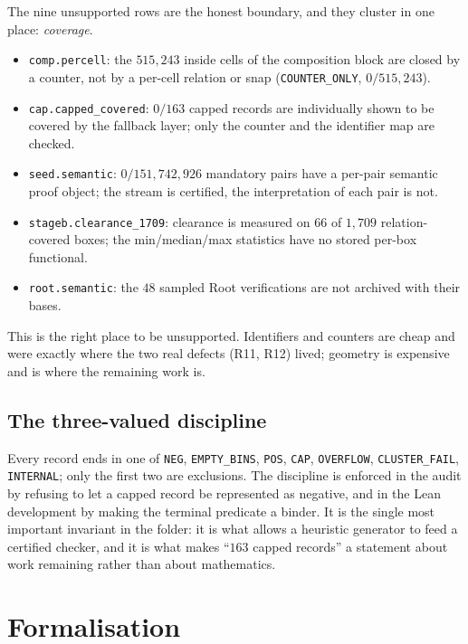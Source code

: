 \documentclass[10pt]{article}
\theoremstyle{definition}
\newcommand{\file}[1]{\texttt{\small #1}}
\begin{document}
The nine unsupported rows are the honest boundary, and they cluster in one place: \emph{coverage}.
\begin{itemize}[leftmargin=1.2em,itemsep=1pt]
\item \file{comp.percell}: the $515{,}243$ inside cells of the composition block are closed by a
counter, not by a per-cell relation or snap (\texttt{COUNTER\_ONLY}, $0/515{,}243$).
\item \file{cap.capped\_covered}: $0/163$ capped records are individually shown to be covered by the
fallback layer; only the counter and the identifier map are checked.
\item \file{seed.semantic}: $0/151{,}742{,}926$ mandatory pairs have a per-pair semantic proof object;
the stream is certified, the interpretation of each pair is not.
\item \file{stageb.clearance\_1709}: clearance is measured on $66$ of $1{,}709$ relation-covered boxes;
the min/median/max statistics have no stored per-box functional.
\item \file{root.semantic}: the $48$ sampled Root verifications are not archived with their bases.
\end{itemize}
This is the right place to be unsupported. Identifiers and counters are cheap and were exactly where
the two real defects (R11, R12) lived; geometry is expensive and is where the remaining work is.

\subsection{The three-valued discipline}
Every record ends in one of \texttt{NEG}, \texttt{EMPTY\_BINS}, \texttt{POS}, \texttt{CAP},
\texttt{OVERFLOW}, \texttt{CLUSTER\_FAIL}, \texttt{INTERNAL}; only the first two are exclusions. The
discipline is enforced in the audit by refusing to let a capped record be represented as negative, and
in the Lean development by making the terminal predicate a binder. It is the single most important
invariant in the folder: it is what allows a heuristic generator to feed a certified checker, and it is
what makes ``$163$ capped records'' a statement about work remaining rather than about mathematics.

\section{Formalisation}\label{sec:formal}
\end{document}
